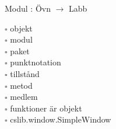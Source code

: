 
    Modul : Övn  $\rightarrow$ Labb 
    \begin{multicols}{3}\SlideFontTiny
    $\square$ objekt \\
$\square$ modul \\
$\square$ paket \\
$\square$ punktnotation \\
$\square$ tillstånd \\
$\square$ metod \\
$\square$ medlem \\
$\square$ funktioner är objekt \\
$\square$ cslib.window.SimpleWindow \\
    \end{multicols}
    